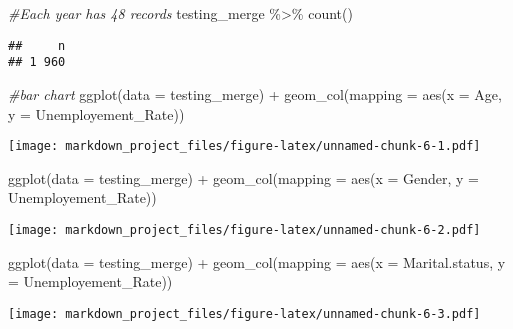 \documentclass[
]{article}
\newenvironment{Shaded}{\begin{snugshade}}{\end{snugshade}}
\newcommand{\AttributeTok}[1]{\textcolor[rgb]{0.77,0.63,0.00}{#1}}
\newcommand{\CommentTok}[1]{\textcolor[rgb]{0.56,0.35,0.01}{\textit{#1}}}
\newcommand{\FunctionTok}[1]{\textcolor[rgb]{0.00,0.00,0.00}{#1}}
\newcommand{\NormalTok}[1]{#1}
\newcommand{\SpecialCharTok}[1]{\textcolor[rgb]{0.00,0.00,0.00}{#1}}
\begin{document}
\begin{Shaded}
\begin{Highlighting}[]
\CommentTok{\#Each year has 48 records}
\NormalTok{testing\_merge }\SpecialCharTok{\%\textgreater{}\%} \FunctionTok{count}\NormalTok{()}
\end{Highlighting}
\end{Shaded}

\begin{verbatim}
##     n
## 1 960
\end{verbatim}

\begin{Shaded}
\begin{Highlighting}[]
\CommentTok{\#bar chart}
\FunctionTok{ggplot}\NormalTok{(}\AttributeTok{data =}\NormalTok{ testing\_merge) }\SpecialCharTok{+}
  \FunctionTok{geom\_col}\NormalTok{(}\AttributeTok{mapping =} \FunctionTok{aes}\NormalTok{(}\AttributeTok{x =}\NormalTok{ Age, }\AttributeTok{y =}\NormalTok{ Unemployement\_Rate))}
\end{Highlighting}
\end{Shaded}

\texttt{[image: markdown\_project\_files/figure-latex/unnamed-chunk-6-1.pdf]}

\begin{Shaded}
\begin{Highlighting}[]
\FunctionTok{ggplot}\NormalTok{(}\AttributeTok{data =}\NormalTok{ testing\_merge) }\SpecialCharTok{+}
  \FunctionTok{geom\_col}\NormalTok{(}\AttributeTok{mapping =} \FunctionTok{aes}\NormalTok{(}\AttributeTok{x =}\NormalTok{ Gender, }\AttributeTok{y =}\NormalTok{ Unemployement\_Rate))}
\end{Highlighting}
\end{Shaded}

\texttt{[image: markdown\_project\_files/figure-latex/unnamed-chunk-6-2.pdf]}

\begin{Shaded}
\begin{Highlighting}[]
\FunctionTok{ggplot}\NormalTok{(}\AttributeTok{data =}\NormalTok{ testing\_merge) }\SpecialCharTok{+}
  \FunctionTok{geom\_col}\NormalTok{(}\AttributeTok{mapping =} \FunctionTok{aes}\NormalTok{(}\AttributeTok{x =}\NormalTok{ Marital.status, }\AttributeTok{y =}\NormalTok{ Unemployement\_Rate))}
\end{Highlighting}
\end{Shaded}

\texttt{[image: markdown\_project\_files/figure-latex/unnamed-chunk-6-3.pdf]}
\end{document}
